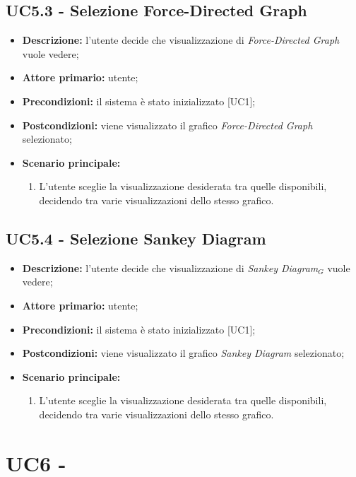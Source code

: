 \subsection{UC5.3 - Selezione Force-Directed Graph}
\begin{itemize}
    \item \textbf{Descrizione:} l'utente decide che visualizzazione di \textit{Force-Directed Graph} vuole vedere;
    \item \textbf{Attore primario:} utente;
    \item \textbf{Precondizioni:} il sistema è stato inizializzato [UC1];
    \item \textbf{Postcondizioni:} viene visualizzato il grafico \textit{Force-Directed Graph} selezionato;
    \item \textbf{Scenario principale:}
    \begin{enumerate}
      \item L'utente sceglie la visualizzazione desiderata tra quelle disponibili, decidendo tra varie visualizzazioni dello stesso grafico.
    \end{enumerate}
\end{itemize}

\subsection{UC5.4 - Selezione Sankey Diagram}
\begin{itemize}
    \item \textbf{Descrizione:} l'utente decide che visualizzazione di \textit{Sankey Diagram}$_G$ vuole vedere;
    \item \textbf{Attore primario:} utente;
    \item \textbf{Precondizioni:} il sistema è stato inizializzato [UC1];
    \item \textbf{Postcondizioni:} viene visualizzato il grafico \textit{Sankey Diagram} selezionato;
    \item \textbf{Scenario principale:}
    \begin{enumerate}
      \item L'utente sceglie la visualizzazione desiderata tra quelle disponibili, decidendo tra varie visualizzazioni dello stesso grafico.
    \end{enumerate}
\end{itemize}

\section{UC6 - }

